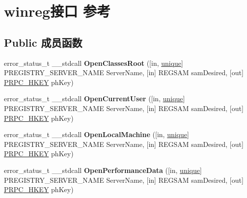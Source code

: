 \hypertarget{interfacewinreg}{}\section{winreg接口 参考}
\label{interfacewinreg}
\subsection*{Public 成员函数}
\begin{DoxyCompactItemize}
\item 
\mbox{\label{interfacewinreg_a443ae68a61fab5721fd3f5aac9c1ad08}} 
error\+\_\+status\+\_\+t \+\_\+\+\_\+stdcall {\bfseries Open\+Classes\+Root} (\mbox{[}in, \hyperlink{interfaceunique}{unique}\mbox{]} P\+R\+E\+G\+I\+S\+T\+R\+Y\+\_\+\+S\+E\+R\+V\+E\+R\+\_\+\+N\+A\+ME Server\+Name, \mbox{[}in\mbox{]} R\+E\+G\+S\+AM sam\+Desired, \mbox{[}out\mbox{]} \hyperlink{interfacevoid}{P\+R\+P\+C\+\_\+\+H\+K\+EY} ph\+Key)
\item 
\mbox{\label{interfacewinreg_a5e6dec33c5f66cbe25481e4b164ffd7e}} 
error\+\_\+status\+\_\+t \+\_\+\+\_\+stdcall {\bfseries Open\+Current\+User} (\mbox{[}in, \hyperlink{interfaceunique}{unique}\mbox{]} P\+R\+E\+G\+I\+S\+T\+R\+Y\+\_\+\+S\+E\+R\+V\+E\+R\+\_\+\+N\+A\+ME Server\+Name, \mbox{[}in\mbox{]} R\+E\+G\+S\+AM sam\+Desired, \mbox{[}out\mbox{]} \hyperlink{interfacevoid}{P\+R\+P\+C\+\_\+\+H\+K\+EY} ph\+Key)
\item 
\mbox{\label{interfacewinreg_a39a1a74359b910d1ce73bee85cc8d481}} 
error\+\_\+status\+\_\+t \+\_\+\+\_\+stdcall {\bfseries Open\+Local\+Machine} (\mbox{[}in, \hyperlink{interfaceunique}{unique}\mbox{]} P\+R\+E\+G\+I\+S\+T\+R\+Y\+\_\+\+S\+E\+R\+V\+E\+R\+\_\+\+N\+A\+ME Server\+Name, \mbox{[}in\mbox{]} R\+E\+G\+S\+AM sam\+Desired, \mbox{[}out\mbox{]} \hyperlink{interfacevoid}{P\+R\+P\+C\+\_\+\+H\+K\+EY} ph\+Key)
\item 
\mbox{\label{interfacewinreg_ab1c866007bf217029ea189db7a76340e}} 
error\+\_\+status\+\_\+t \+\_\+\+\_\+stdcall {\bfseries Open\+Performance\+Data} (\mbox{[}in, \hyperlink{interfaceunique}{unique}\mbox{]} P\+R\+E\+G\+I\+S\+T\+R\+Y\+\_\+\+S\+E\+R\+V\+E\+R\+\_\+\+N\+A\+ME Server\+Name, \mbox{[}in\mbox{]} R\+E\+G\+S\+AM sam\+Desired, \mbox{[}out\mbox{]} \hyperlink{interfacevoid}{P\+R\+P\+C\+\_\+\+H\+K\+EY} ph\+Key)

\end{DoxyCompactItemize}

